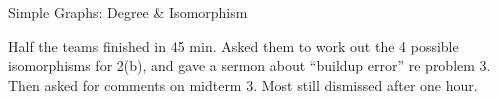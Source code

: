 \documentclass[handout]{mcs}
\begin{document}


\begin{staffnotes}
Simple Graphs: Degree \& Isomorphism

Half the teams finished in 45 min.  Asked them to work out the 4
possible isomorphisms for 2(b), and gave a sermon about ``buildup
error'' re problem 3.  Then asked for comments on midterm 3.
Most still dismissed after one hour.
\end{staffnotes}





\end{document}
